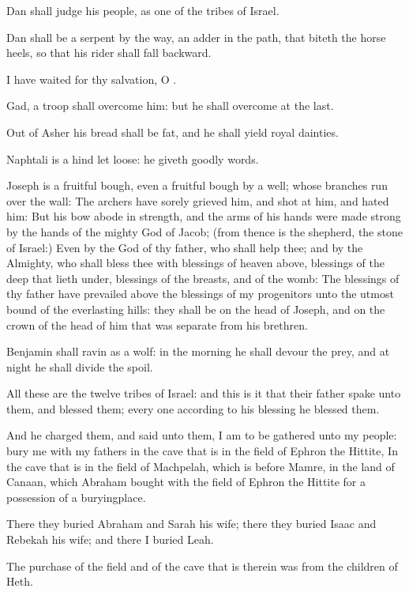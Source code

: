 \verse Dan shall judge his people, as one of the tribes of Israel.

\verse Dan shall be a serpent by the way, an adder in the path, that biteth the horse heels, so that his rider shall fall backward.

\verse I have waited for thy salvation, O \LORD.

\verse Gad, a troop shall overcome him: but he shall overcome at the last.

\verse Out of Asher his bread shall be fat, and he shall yield royal dainties.

\verse Naphtali is a hind let loose: he giveth goodly words.

\verse Joseph is a fruitful bough, even a fruitful bough by a well; whose branches run over the wall: \verse The archers have sorely grieved him, and shot at him, and hated him: \verse But his bow abode in strength, and the arms of his hands were made strong by the hands of the mighty God of Jacob; (from thence is the shepherd, the stone of Israel:) \verse Even by the God of thy father, who shall help thee; and by the Almighty, who shall bless thee with blessings of heaven above, blessings of the deep that lieth under, blessings of the breasts, and of the womb: \verse The blessings of thy father have prevailed above the blessings of my progenitors unto the utmost bound of the everlasting hills: they shall be on the head of Joseph, and on the crown of the head of him that was separate from his brethren.

\verse Benjamin shall ravin as a wolf: in the morning he shall devour the prey, and at night he shall divide the spoil.

\verse All these are the twelve tribes of Israel: and this is it that their father spake unto them, and blessed them; every one according to his blessing he blessed them.

\verse And he charged them, and said unto them, I am to be gathered unto my people: bury me with my fathers in the cave that is in the field of Ephron the Hittite, \verse In the cave that is in the field of Machpelah, which is before Mamre, in the land of Canaan, which Abraham bought with the field of Ephron the Hittite for a possession of a buryingplace.

\verse There they buried Abraham and Sarah his wife; there they buried Isaac and Rebekah his wife; and there I buried Leah.

\verse The purchase of the field and of the cave that is therein was from the children of Heth.

